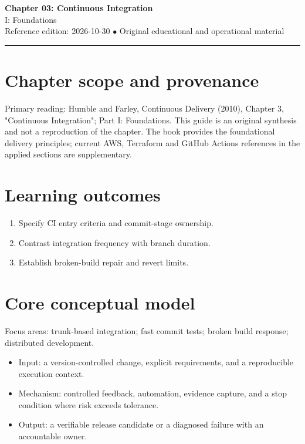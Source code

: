 \documentclass[10pt,letterpaper]{article}
\begin{document}
\begin{center}
{\LARGE\bfseries\color{cdblue}Chapter 03: Continuous Integration}\\[7pt]
{\large I: Foundations}\\[6pt]
{\small Reference edition: 2026-10-30 $\bullet$ Original educational and operational material}
\end{center}
\noindent\color{cdblue}\rule{\linewidth}{1.2pt}\color{black}
\vspace{0.4em}
\section{Chapter scope and provenance}
Primary reading: Humble and Farley, Continuous Delivery (2010), Chapter 3, "Continuous Integration"; Part I: Foundations. This guide is an original synthesis and not a reproduction of the chapter. The book provides the foundational delivery principles; current AWS, Terraform and GitHub Actions references in the applied sections are supplementary.


\section{Learning outcomes}
\begin{enumerate}
\item Specify CI entry criteria and commit-stage ownership.
\item Contrast integration frequency with branch duration.
\item Establish broken-build repair and revert limits.
\end{enumerate}

\section{Core conceptual model}
Focus areas: trunk-based integration; fast commit tests; broken build response; distributed development.

\begin{itemize}
\item Input: a version-controlled change, explicit requirements, and a reproducible execution context.
\item Mechanism: controlled feedback, automation, evidence capture, and a stop condition where risk exceeds tolerance.
\item Output: a verifiable release candidate or a diagnosed failure with an accountable owner.
\end{itemize}
\end{document}
